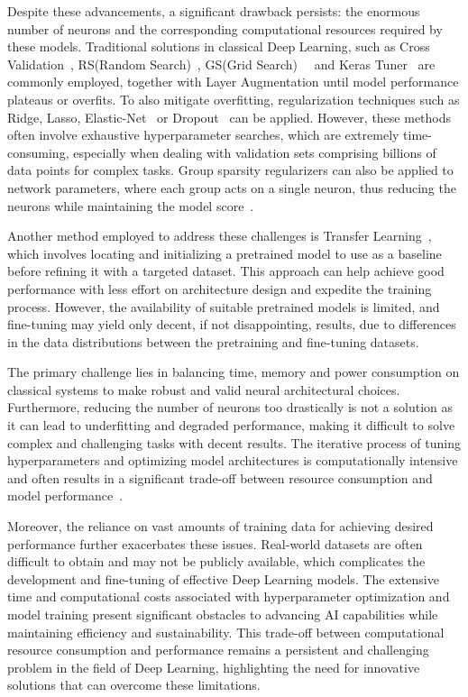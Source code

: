 \documentclass[12pt,a4paper]{report}
\begin{document}
Despite these advancements, a significant drawback persists: the enormous number of neurons and the corresponding computational resources required by these models. Traditional solutions in classical Deep Learning, such as Cross Validation~\cite{berrar2019cross}, RS(Random Search)~\cite{liashchynskyi2019grid}, GS(Grid Search)~\cite{liashchynskyi2019grid}~\cite{liashchynskyi2019grid} and Keras Tuner~\cite{pon2021hyperparameter} are commonly employed, together with Layer Augmentation until model performance plateaus or overfits. To also mitigate overfitting, regularization techniques such as Ridge, Lasso, Elastic-Net~\cite{ogutu2012genomic} or Dropout~\cite{srivastava2014dropout} can be applied. However, these methods often involve exhaustive hyperparameter searches, which are extremely time-consuming, especially when dealing with validation sets comprising billions of data points for complex tasks. Group sparsity regularizers can also be applied to network parameters, where each group acts on a single neuron, thus reducing the neurons while maintaining the model score~\cite{alvarez2018learning}.

Another method employed to address these challenges is Transfer Learning~\cite{weiss2016survey}, which involves locating and initializing a pretrained model to use as a baseline before refining it with a targeted dataset. This approach can help achieve good performance with less effort on architecture design and expedite the training process. However, the availability of suitable pretrained models is limited, and fine-tuning may yield only decent, if not disappointing, results, due to differences in the data distributions between the pretraining and fine-tuning datasets.

The primary challenge lies in balancing time, memory and power consumption on classical systems to make robust and valid neural architectural choices. Furthermore, reducing the number of neurons too drastically is not a solution as it can lead to underfitting and degraded performance, making it difficult to solve complex and challenging tasks with decent results. The iterative process of tuning hyperparameters and optimizing model architectures is computationally intensive and often results in a significant trade-off between resource consumption and model performance~\cite{liashchynskyi2019grid}.

Moreover, the reliance on vast amounts of training data for achieving desired performance further exacerbates these issues. Real-world datasets are often difficult to obtain and may not be publicly available, which complicates the development and fine-tuning of effective Deep Learning models. The extensive time and computational costs associated with hyperparameter optimization and model training present significant obstacles to advancing AI capabilities while maintaining efficiency and sustainability. This trade-off between computational resource consumption and performance remains a persistent and challenging problem in the field of Deep Learning, highlighting the need for innovative solutions that can overcome these limitations.
\end{document}
